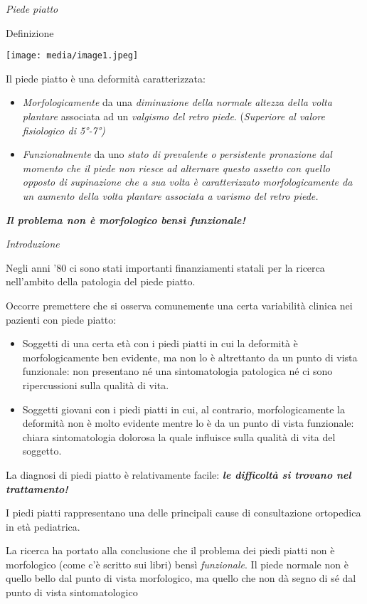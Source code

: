 \documentclass[]{article}
\date{}
\begin{document}
\emph{Piede piatto}

Definizione

\texttt{[image: media/image1.jpeg]}

Il piede piatto è una deformità caratterizzata:

\begin{itemize}
\item
  \emph{Morfologicamente} da una \emph{diminuzione della normale altezza
  della volta plantare} associata ad un \emph{valgismo del retro piede}.
  (\emph{Superiore al valore fisiologico di 5°-7°)}
\item
  \emph{Funzionalmente} da uno \emph{stato di prevalente o persistente
  pronazione} \emph{dal momento che il piede non riesce ad alternare
  questo assetto con quello opposto di supinazione che a sua volta è
  caratterizzato morfologicamente da un aumento della volta plantare
  associata a varismo del retro piede.}
\end{itemize}

\textbf{\emph{Il problema non è morfologico bensì funzionale!}}

\emph{Introduzione}

Negli anni '80 ci sono stati importanti finanziamenti statali per la
ricerca nell'ambito della patologia del piede piatto.

Occorre premettere che si osserva comunemente una certa variabilità
clinica nei pazienti con piede piatto:

\begin{itemize}
\item
  Soggetti di una certa età con i piedi piatti in cui la deformità è
  morfologicamente ben evidente, ma non lo è altrettanto da un punto di
  vista funzionale: non presentano né una sintomatologia patologica né
  ci sono ripercussioni sulla qualità di vita.
\item
  Soggetti giovani con i piedi piatti in cui, al contrario,
  morfologicamente la deformità non è molto evidente mentre lo è da un
  punto di vista funzionale: chiara sintomatologia dolorosa la quale
  influisce sulla qualità di vita del soggetto.
\end{itemize}

La diagnosi di piedi piatto è relativamente facile: \textbf{\emph{le
difficoltà si trovano nel trattamento!}}

I piedi piatti rappresentano una delle principali cause di consultazione
ortopedica in età pediatrica.

La ricerca ha portato alla conclusione che il problema dei piedi piatti
non è morfologico (come c'è scritto sui libri) bensì \emph{funzionale}.
Il piede normale non è quello bello dal punto di vista morfologico, ma
quello che non dà segno di sé dal punto di vista sintomatologico
\end{document}
